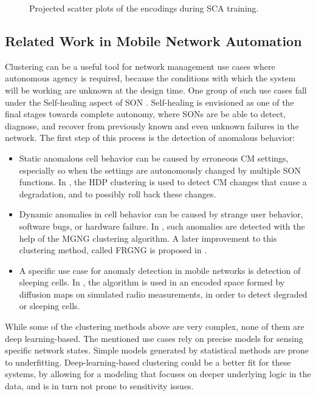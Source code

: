 \begin{figure}[ht]
{				}
				\caption[Projected scatter plots of the encodings during SCA training]{Projected scatter plots of the encodings during SCA training.}
				\label{fig:sca_training_scatter}
			\end{figure}
			
		\subsection{Related Work in Mobile Network Automation}
			
			Clustering can be a useful tool for network management use cases where autonomous agency is required, because the conditions with which the system will be working are unknown at the design time.
			One group of such use cases fall under the Self-healing aspect of \ac{SON} \cite{SONbook}.
			Self-healing is envisioned as one of the final stages towards complete autonomy, where \acp{SON} are be able to detect, diagnose, and recover from previously known and even unknown failures in the network.
			The first step of this process is the detection of anomalous behavior:
			
			\begin{itemize}
				\item
					Static anomalous cell behavior can be caused by erroneous \ac{CM} settings, especially so when the settings are autonomously changed by multiple \ac{SON} functions.
					In \cite{ciocarlie2014anomaly}, the \ac{HDP} clustering is used to detect \ac{CM} changes that cause a degradation, and to possibly roll back these changes.
				
				\item
					Dynamic anomalies in cell behavior can be caused by strange user behavior, software bugs, or hardware failure.
					In \cite{gajic2015improved}, such anomalies are detected with the help of the \ac{MGNG} clustering algorithm.
					A later improvement to this clustering method, called \ac{FRGNG} is proposed in \cite{gajic2015frgng}.
				
				\item
					A specific use case for anomaly detection in mobile networks is detection of sleeping cells.
					In \cite{chernogorov2011detection}, the \kmeans{} algorithm is used in an encoded space formed by diffusion maps on simulated radio measurements, in order to detect degraded or sleeping cells.				
			\end{itemize}
			
			While some of the clustering methods above are very complex, none of them are deep learning-based.
			The mentioned use cases rely on precise models for sensing specific network states.
			Simple models generated by statistical methods are prone to underfitting.
			Deep-learning-based clustering could be a better fit for these systems, by allowing for a modeling that focuses on deeper underlying logic in the data, and is in turn not prone to sensitivity issues.
						
